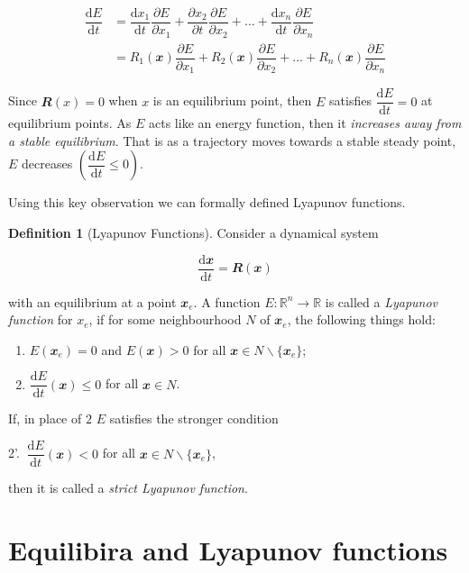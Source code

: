 \documentclass[
  a4paper,
  oneside,
  final]{krantz}
\providecommand{\tightlist}{%
  \setlength{\itemsep}{0pt}\setlength{\parskip}{0pt}}
\newcommand{\R}{\mathbb{R}}
\renewcommand{\d}{\mathrm{d}}
\renewcommand{\v}[1]{{\mathbfit{#1}}}
\newcommand{\pder}[2]{\dfrac{\partial #1}{\partial#2}}
\newcommand{\der}[2]{\dfrac{\d #1}{\d #2}}
\theoremstyle{definition}
\newtheorem{definition}{Definition}[chapter]
\theoremstyle{definition}
\theoremstyle{definition}
\theoremstyle{definition}
\theoremstyle{remark}
\begin{document}
\begin{align*}
\der{E}{t}  &= \der{x_1}{t} \pder{E}{x_1} + \pder{x_2}{t} \pder{E}{x_2} + \ldots + \der{x_n}{t} \pder{E}{x_n} \\ 
&= R_1(\v{x}) \pder{E}{x_1} + R_2(\v{x}) \pder{E}{x_2} + \ldots + R_n(\v{x}) \pder{E}{x_n}  
\end{align*}

Since \(\v{R}(x) = 0\) when \(x\) is an equilibrium point, then \(E\) satisfies \(\der{E}{t} = 0\) at equilibrium points. As \(E\) acts like an energy function, then it \emph{increases away from a stable equilibrium}. That is as a trajectory moves towards a stable steady point, \(E\) decreases \(\left(\der{E}{t} \le 0\right)\).

Using this key observation we can formally defined Lyapunov functions.

\begin{definition}[Lyapunov Functions]
\protect\hypertarget{def:Luapunov-function-def}{}\label{def:Luapunov-function-def}Consider a dynamical system

\[ \der{\v{x}}{t} = \v{R}(\v{x})\]

with an equilibrium at a point \(\v{x}_{e}\). A function \(E: \R^{n} \to \R\) is called a \emph{Lyapunov function} for \(x_{e}\), if for some neighbourhood \(N\) of \(\v{x}_{e}\), the following things hold:

\begin{enumerate}
\def\labelenumi{\arabic{enumi})}
\tightlist
\item
  \(E(\v{x}_{e}) = 0\) and \(E(\v{x}) >0\) for all \(\v{x} \in N \backslash \{\v{x}_{e}\}\);
\item
  \(\der{E}{t}(\v{x}) \le 0\) for all \(\v{x} \in N\).
\end{enumerate}

If, in place of \(2\) \(E\) satisfies the stronger condition

\begin{center}
2'. \(\ \der{E}{t} (\v{x}) < 0\) for all \(\v{x} \in N \backslash \{\v{x}_{e}\}\),

\end{center}

then it is called a \emph{strict Lyapunov function}.
\end{definition}

\hypertarget{Equilibria-and-lyapunov-functions}{%
\section{Equilibira and Lyapunov functions}\label{Equilibria-and-lyapunov-functions}}
\end{document}
